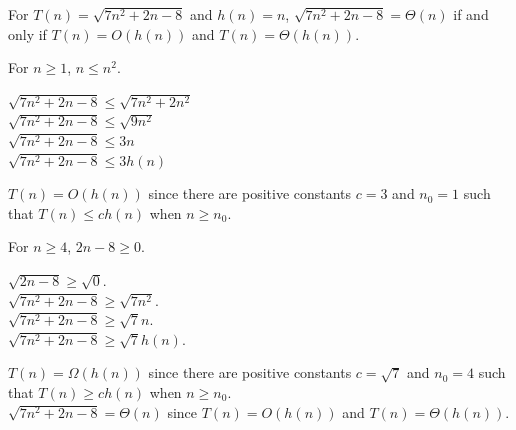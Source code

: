 \documentclass[titlepage]{article}\pagestyle{empty}
\begin{document}
For $T(n) = \sqrt{7n^2 + 2n - 8}$ and $h(n) = n$, $\sqrt{7n^2 + 2n - 8} = \Theta(n)$ if and only if $T(n) = O(h(n))$ and $T(n) = \Theta(h(n))$.\\
\begin{center}
For $n \geq 1$, $n \leq n^2$.\\
\end{center}
\begin{center}
$\sqrt{7n^2 + 2n - 8} \leq \sqrt{7n^2 + 2n^2}$\\
$\sqrt{7n^2 + 2n - 8} \leq \sqrt{9n^2}$\\
$\sqrt{7n^2 + 2n - 8} \leq 3n$\\
$\sqrt{7n^2 + 2n - 8} \leq 3h(n)$\\
\end{center}
$T(n) = O(h(n))$ since there are positive constants $c = 3$ and $n_0 = 1$ such that $T(n) \leq ch(n)$ when $n \geq n_0$.\\
\begin{center}
For $n \geq 4$, $2n - 8 \geq 0.$\\
\end{center}
\begin{center}
$\sqrt{2n - 8} \geq \sqrt{0}.$\\
$\sqrt{7n^2 + 2n - 8} \geq \sqrt{7n^2}.$\\
$\sqrt{7n^2 + 2n - 8} \geq \sqrt{7}n.$\\
$\sqrt{7n^2 + 2n - 8} \geq \sqrt{7}h(n).$\\
\end{center}
$T(n) = \Omega(h(n))$ since there are positive constants $c = \sqrt{7}$ and $n_0 = 4$ such that $T(n) \geq ch(n)$ when $n \geq n_0$.\\
$\sqrt{7n^2 + 2n - 8} = \Theta(n)$ since $T(n) = O(h(n))$ and $T(n) = \Theta(h(n))$.\\
\end{document}
